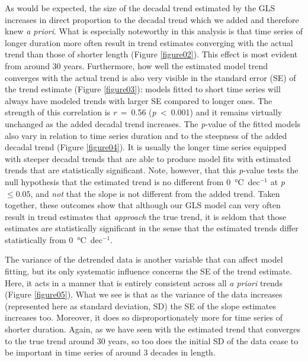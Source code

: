 \documentclass[]{ametsoc}
\begin{document}
As would be expected, the size of the decadal trend estimated by the GLS increases in direct proportion to the decadal trend which we added and therefore knew \emph{a priori}. What is especially noteworthy in this analysis is that time series of longer duration more often result in trend estimates converging with the actual trend than those of shorter length (Figure \ref{figure02}). This effect is most evident from around 30 years. Furthermore, how well the estimated model trend converges with the actual trend is also very visible in the standard error (SE) of the trend estimate (Figure \ref{figure03}): models fitted to short time series will always have modeled trends with larger SE compared to longer ones. The strength of this correlation is \emph{r}~=~0.56 (\emph{p}~\textless~0.001) and it remains virtually unchanged as the added decadal trend increases. The \emph{p}-value of the fitted models also vary in relation to time series duration and to the steepness of the added decadal trend (Figure \ref{figure04}). It is usually the longer time series equipped with steeper decadal trends that are able to produce model fits with estimated trends that are statistically significant. Note, however, that this \emph{p}-value tests the null hypothesis that the estimated trend is no different from \SI{0}{\degreeCelsius}~dec$^{-1}$ at \emph{p} $\leq 0.05$, and \emph{not} that the slope is not different from the added trend. Taken together, these outcomes show that although our GLS model can very often result in trend estimates that \emph{approach} the true trend, it is seldom that those estimates are statistically significant in the sense that the estimated trends differ statistically from \SI{0}{\degreeCelsius}~dec$^{-1}$.

The variance of the detrended data is another variable that can affect model fitting, but its only systematic influence concerns the SE of the trend estimate. Here, it acts in a manner that is entirely consistent across all \emph{a priori} trends (Figure \ref{figure05}). What we see is that as the variance of the data increases (represented here as standard deviation, SD) the SE of the slope estimates increases too. Moreover, it does so disproportionately more for time series of shorter duration. Again, as we have seen with the estimated trend that converges to the true trend around 30 years, so too does the initial SD of the data cease to be important in time series of around 3 decades in length.
\end{document}
